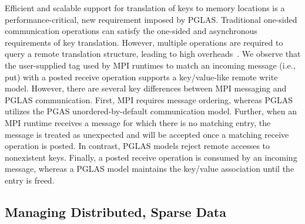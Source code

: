 Efficient and scalable support for translation of keys to memory locations is a
performance-critical, new requirement imposed by PGLAS.  Traditional one-sided
communication operations can satisfy the one-sided and asynchronous
requirements of key translation.  However, multiple operations are required to
query a remote translation structure, leading to high overheads~\cite{namashivayam:15}.  We observe
that the user-supplied tag used by MPI runtimes to match an incoming message
(i.e., put) with a posted receive operation supports a key/value-like remote
write model.
However,
there are several key differences between MPI messaging and PGLAS
communication.  First, MPI requires message ordering, whereas PGLAS utilizes
the PGAS unordered-by-default communication model.  Further, when an MPI
runtime receives a message for which there is no matching entry, the message is
treated as unexpected and will be accepted once a matching receive operation is
posted.  In contrast, PGLAS models reject remote accesses to nonexistent keys.
Finally, a posted receive operation is consumed by an incoming message, whereas
a PGLAS model maintains the key/value association until the entry is freed.

%

\vspace{-2.1mm}

\subsection{Managing Distributed, Sparse Data}

